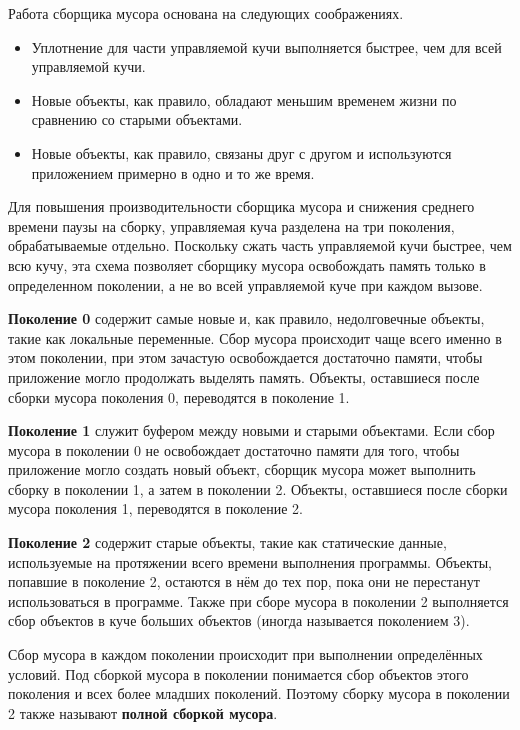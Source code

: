 Работа сборщика мусора основана на следующих соображениях.~\cite{dotnet_gc}

\begin{itemize}[label*=---]
	\item Уплотнение для части управляемой кучи выполняется быстрее, чем для всей управляемой кучи.
	\item Новые объекты, как правило, обладают меньшим временем жизни по сравнению со старыми объектами.
	\item Новые объекты, как правило, связаны друг с другом и используются приложением примерно в одно и то же время.
\end{itemize}

Для повышения производительности сборщика мусора и снижения среднего времени паузы на сборку, управляемая куча разделена на три поколения, обрабатываемые отдельно. Поскольку сжать часть управляемой кучи быстрее, чем всю кучу, эта схема позволяет сборщику мусора освобождать память только в определенном поколении, а не во всей управляемой куче при каждом вызове.~\cite{dotnet_gc}~\cite{dotnet_memory}

\textbf{Поколение 0} содержит самые новые и, как правило, недолговечные объекты, такие как локальные переменные. Сбор мусора происходит чаще всего именно в этом поколении, при этом зачастую освобождается достаточно памяти, чтобы приложение могло продолжать выделять память. Объекты, оставшиеся после сборки мусора поколения 0, переводятся в поколение 1.

\textbf{Поколение 1} служит буфером между новыми и старыми объектами. Если сбор мусора в поколении 0 не освобождает достаточно памяти для того, чтобы приложение могло создать новый объект, сборщик мусора может выполнить сборку в поколении 1, а затем в поколении 2. Объекты, оставшиеся после сборки мусора поколения 1, переводятся в поколение 2.

\textbf{Поколение 2} содержит старые объекты, такие как статические данные, используемые на протяжении всего времени выполнения программы. Объекты, попавшие в поколение 2, остаются в нём до тех пор, пока они не перестанут использоваться в программе. Также при сборе мусора в поколении 2 выполняется сбор объектов в куче больших объектов (иногда называется поколением 3).

Сбор мусора в каждом поколении происходит при выполнении определённых условий. Под сборкой мусора в поколении понимается сбор объектов этого поколения и всех более младших поколений. Поэтому сборку мусора в поколении 2 также называют \textbf{полной сборкой мусора}. \cite{dotnet_gc}


